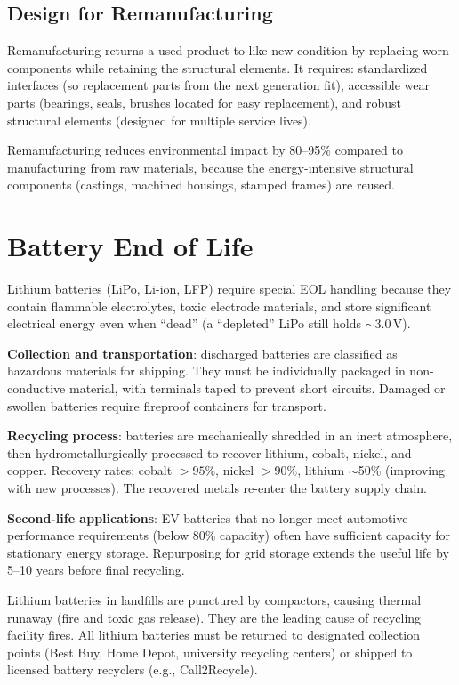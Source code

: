 \documentclass[11pt,letterpaper,twoside,openany]{book}
\begin{document}
\subsection{Design for Remanufacturing}
Remanufacturing returns a used product to like-new condition by replacing worn components while retaining the structural elements. It requires: standardized interfaces (so replacement parts from the next generation fit), accessible wear parts (bearings, seals, brushes located for easy replacement), and robust structural elements (designed for multiple service lives).

Remanufacturing reduces environmental impact by 80--95\% compared to manufacturing from raw materials, because the energy-intensive structural components (castings, machined housings, stamped frames) are reused.

\section{Battery End of Life}
Lithium batteries (LiPo, Li-ion, LFP) require special EOL handling because they contain flammable electrolytes, toxic electrode materials, and store significant electrical energy even when ``dead'' (a ``depleted'' LiPo still holds $\sim$3.0\,V).

\textbf{Collection and transportation}: discharged batteries are classified as hazardous materials for shipping. They must be individually packaged in non-conductive material, with terminals taped to prevent short circuits. Damaged or swollen batteries require fireproof containers for transport.

\textbf{Recycling process}: batteries are mechanically shredded in an inert atmosphere, then hydrometallurgically processed to recover lithium, cobalt, nickel, and copper. Recovery rates: cobalt $> 95\%$, nickel $> 90\%$, lithium $\sim$50\% (improving with new processes). The recovered metals re-enter the battery supply chain.

\textbf{Second-life applications}: EV batteries that no longer meet automotive performance requirements (below 80\% capacity) often have sufficient capacity for stationary energy storage. Repurposing for grid storage extends the useful life by 5--10 years before final recycling.

\begin{warningbox}
Lithium batteries in landfills are punctured by compactors, causing thermal runaway (fire and toxic gas release). They are the leading cause of recycling facility fires. All lithium batteries must be returned to designated collection points (Best Buy, Home Depot, university recycling centers) or shipped to licensed battery recyclers (e.g., Call2Recycle).
\end{warningbox}
\end{document}
